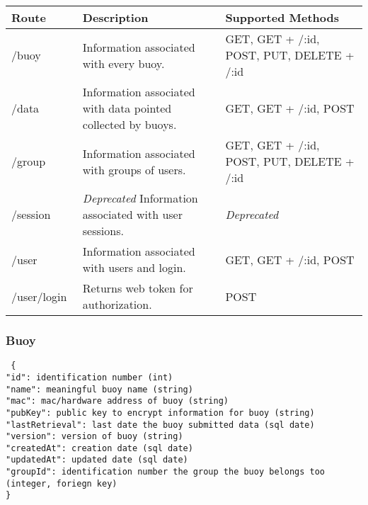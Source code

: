 \begin{center}
  \begin{tabular}{| p{0.2\linewidth} | p{0.4\linewidth}  | p{0.4\linewidth} |}
    \hline
    Route & Description & Supported Methods \\
    \hline
    /buoy & Information associated with every buoy. & GET, GET + /:id, POST, PUT, DELETE + /:id \\
    \hline
    /data & Information associated with data pointed collected by buoys. & GET, GET + /:id, POST \\
    \hline
    /group & Information associated with groups of users. & GET, GET + /:id, POST, PUT, DELETE + /:id \\
    \hline
    /session & \emph{Deprecated} Information associated with user sessions. & \emph{Deprecated} \\
    \hline
    /user & Information associated with users and login. & GET, GET + /:id, POST \\
    \hline
    /user/login & Returns web token for authorization. & POST \\
    \hline
  \end{tabular}
\end{center}
\subsubsection{Buoy}
\texttt{
\{ \\
    "id": identification number (int)\\
    "name": meaningful buoy name (string)\\
    "mac": mac/hardware address of buoy (string)\\
    "pubKey": public key to encrypt information for buoy (string)\\
    "lastRetrieval": last date the buoy submitted data (sql date)\\
    "version": version of buoy (string)\\
    "createdAt": creation date (sql date)\\
    "updatedAt": updated date (sql date)\\
    "groupId": identification number the group the buoy belongs too (integer, foriegn key)\\
\}
}
